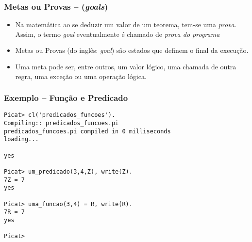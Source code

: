 \begin{frame}[fragile]

	\frametitle{Metas ou Provas -- (\textit{goals})}
	
	\begin{itemize}
	    
	 \item Na matemática ao se deduzir um valor de um teorema, tem-se uma \textit{prova}. 
	  Assim, o termo  \textit{goal} eventualmente é chamado de \textit{prova do programa}
	 
	 \pause
	    \item Metas ou Provas (do inglês: \textit{goal}) são estados que definem o final da execução.
	    
  	 \pause
	    \item Uma meta pode ser, entre outros, um valor lógico, uma chamada de outra regra, 
	    uma exceção ou uma operação lógica.
	\end{itemize}

\end{frame}
    
  

\begin{frame} [fragile]

\frametitle{Exemplo -- Função e Predicado}
\begin{small}

\begin{verbatim}
Picat> cl('predicados_funcoes').
Compiling:: predicados_funcoes.pi
predicados_funcoes.pi compiled in 0 milliseconds
loading...

yes

Picat> um_predicado(3,4,Z), write(Z).
7Z = 7
yes

Picat> uma_funcao(3,4) = R, write(R).
7R = 7
yes

Picat>
\end{verbatim}
\end{small}
\end{frame}

